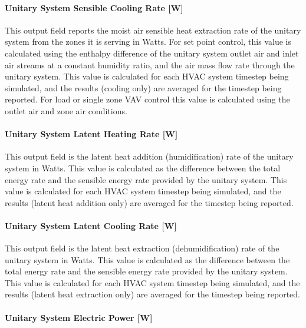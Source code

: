 \paragraph{Unitary System Sensible Cooling Rate {[}W{]}}\label{unitary-system-sensible-cooling-rate-w}

This output field reports the moist air sensible heat extraction rate of the unitary system from the zones it is serving in Watts. For set point control, this value is calculated using the enthalpy difference of the unitary system outlet air and inlet air streams at a constant humidity ratio, and the air mass flow rate through the unitary system. This value is calculated for each HVAC system timestep being simulated, and the results (cooling only) are averaged for the timestep being reported. For load or single zone VAV control this value is calculated using the outlet air and zone air conditions.

\paragraph{Unitary System Latent Heating Rate {[}W{]}}\label{unitary-system-latent-heating-rate-w}

This output field is the latent heat addition (humidification) rate of the unitary system in Watts. This value is calculated as the difference between the total energy rate and the sensible energy rate provided by the unitary system. This value is calculated for each HVAC system timestep being simulated, and the results (latent heat addition only) are averaged for the timestep being reported.

\paragraph{Unitary System Latent Cooling Rate {[}W{]}}\label{unitary-system-latent-cooling-rate-w}

This output field is the latent heat extraction (dehumidification) rate of the unitary system in Watts. This value is calculated as the difference between the total energy rate and the sensible energy rate provided by the unitary system. This value is calculated for each HVAC system timestep being simulated, and the results (latent heat extraction only) are averaged for the timestep being reported.

\paragraph{Unitary System Electric Power {[}W{]}}\label{unitary-system-electric-power-w}

